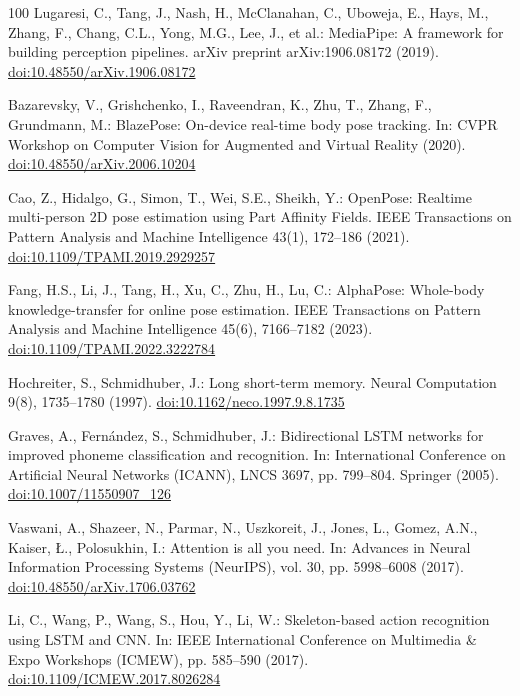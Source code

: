 \documentclass[preprint,12pt]{elsarticle}
\begin{document}
\begin{thebibliography}{100}
Lugaresi, C., Tang, J., Nash, H., McClanahan, C., Uboweja, E., Hays, M., Zhang, F., Chang, C.L., Yong, M.G., Lee, J., et al.: MediaPipe: A framework for building perception pipelines. arXiv preprint arXiv:1906.08172 (2019). \href{https://doi.org/10.48550/arXiv.1906.08172}{doi:10.48550/arXiv.1906.08172}

Bazarevsky, V., Grishchenko, I., Raveendran, K., Zhu, T., Zhang, F., Grundmann, M.: BlazePose: On-device real-time body pose tracking. In: CVPR Workshop on Computer Vision for Augmented and Virtual Reality (2020). \href{https://doi.org/10.48550/arXiv.2006.10204}{doi:10.48550/arXiv.2006.10204}

Cao, Z., Hidalgo, G., Simon, T., Wei, S.E., Sheikh, Y.: OpenPose: Realtime multi-person 2D pose estimation using Part Affinity Fields. IEEE Transactions on Pattern Analysis and Machine Intelligence 43(1), 172--186 (2021). \href{https://doi.org/10.1109/TPAMI.2019.2929257}{doi:10.1109/TPAMI.2019.2929257}

Fang, H.S., Li, J., Tang, H., Xu, C., Zhu, H., Lu, C.: AlphaPose: Whole-body knowledge-transfer for online pose estimation. IEEE Transactions on Pattern Analysis and Machine Intelligence 45(6), 7166--7182 (2023). \href{https://doi.org/10.1109/TPAMI.2022.3222784}{doi:10.1109/TPAMI.2022.3222784}

Hochreiter, S., Schmidhuber, J.: Long short-term memory. Neural Computation 9(8), 1735--1780 (1997). \href{https://doi.org/10.1162/neco.1997.9.8.1735}{doi:10.1162/neco.1997.9.8.1735}

Graves, A., Fern\'{a}ndez, S., Schmidhuber, J.: Bidirectional LSTM networks for improved phoneme classification and recognition. In: International Conference on Artificial Neural Networks (ICANN), LNCS 3697, pp. 799--804. Springer (2005). \href{https://doi.org/10.1007/11550907_126}{doi:10.1007/11550907\_126}

Vaswani, A., Shazeer, N., Parmar, N., Uszkoreit, J., Jones, L., Gomez, A.N., Kaiser, \L., Polosukhin, I.: Attention is all you need. In: Advances in Neural Information Processing Systems (NeurIPS), vol. 30, pp. 5998--6008 (2017). \href{https://doi.org/10.48550/arXiv.1706.03762}{doi:10.48550/arXiv.1706.03762}

Li, C., Wang, P., Wang, S., Hou, Y., Li, W.: Skeleton-based action recognition using LSTM and CNN. In: IEEE International Conference on Multimedia \& Expo Workshops (ICMEW), pp. 585--590 (2017). \href{https://doi.org/10.1109/ICMEW.2017.8026284}{doi:10.1109/ICMEW.2017.8026284}


\end{thebibliography}
\end{document}
